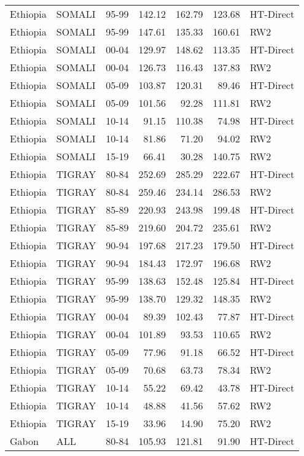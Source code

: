 \begin{longtable}{lllrrrl}
  Ethiopia & SOMALI & 95-99 & 142.12 & 162.79 & 123.68 & HT-Direct \\ 
  Ethiopia & SOMALI & 95-99 & 147.61 & 135.33 & 160.61 & RW2 \\ 
  Ethiopia & SOMALI & 00-04 & 129.97 & 148.62 & 113.35 & HT-Direct \\ 
  Ethiopia & SOMALI & 00-04 & 126.73 & 116.43 & 137.83 & RW2 \\ 
  Ethiopia & SOMALI & 05-09 & 103.87 & 120.31 & 89.46 & HT-Direct \\ 
  Ethiopia & SOMALI & 05-09 & 101.56 & 92.28 & 111.81 & RW2 \\ 
  Ethiopia & SOMALI & 10-14 & 91.15 & 110.38 & 74.98 & HT-Direct \\ 
  Ethiopia & SOMALI & 10-14 & 81.86 & 71.20 & 94.02 & RW2 \\ 
  Ethiopia & SOMALI & 15-19 & 66.41 & 30.28 & 140.75 & RW2 \\ 
  Ethiopia & TIGRAY & 80-84 & 252.69 & 285.29 & 222.67 & HT-Direct \\ 
  Ethiopia & TIGRAY & 80-84 & 259.46 & 234.14 & 286.53 & RW2 \\ 
  Ethiopia & TIGRAY & 85-89 & 220.93 & 243.98 & 199.48 & HT-Direct \\ 
  Ethiopia & TIGRAY & 85-89 & 219.60 & 204.72 & 235.61 & RW2 \\ 
  Ethiopia & TIGRAY & 90-94 & 197.68 & 217.23 & 179.50 & HT-Direct \\ 
  Ethiopia & TIGRAY & 90-94 & 184.43 & 172.97 & 196.68 & RW2 \\ 
  Ethiopia & TIGRAY & 95-99 & 138.63 & 152.48 & 125.84 & HT-Direct \\ 
  Ethiopia & TIGRAY & 95-99 & 138.70 & 129.32 & 148.35 & RW2 \\ 
  Ethiopia & TIGRAY & 00-04 & 89.39 & 102.43 & 77.87 & HT-Direct \\ 
  Ethiopia & TIGRAY & 00-04 & 101.89 & 93.53 & 110.65 & RW2 \\ 
  Ethiopia & TIGRAY & 05-09 & 77.96 & 91.18 & 66.52 & HT-Direct \\ 
  Ethiopia & TIGRAY & 05-09 & 70.68 & 63.73 & 78.34 & RW2 \\ 
  Ethiopia & TIGRAY & 10-14 & 55.22 & 69.42 & 43.78 & HT-Direct \\ 
  Ethiopia & TIGRAY & 10-14 & 48.88 & 41.56 & 57.62 & RW2 \\ 
  Ethiopia & TIGRAY & 15-19 & 33.96 & 14.90 & 75.20 & RW2 \\ 
  Gabon & ALL & 80-84 & 105.93 & 121.81 & 91.90 & HT-Direct \\ 

\end{longtable}
